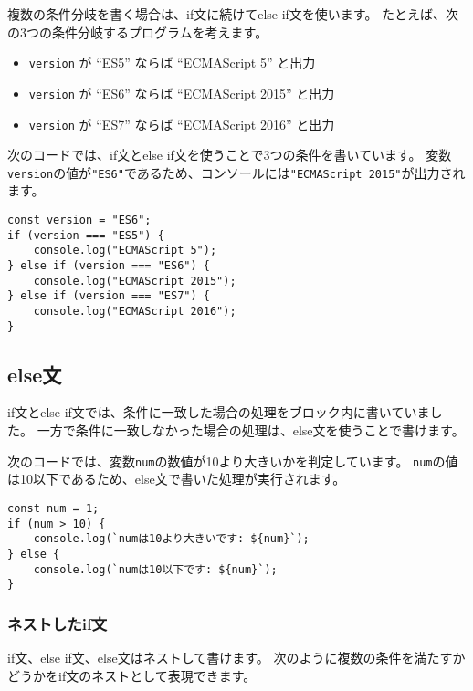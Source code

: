 複数の条件分岐を書く場合は、if文に続けてelse if文を使います。
たとえば、次の3つの条件分岐するプログラムを考えます。

\begin{itemize}
\item
  \texttt{version} が ``ES5'' ならば ``ECMAScript 5''
  と出力
\item
  \texttt{version} が ``ES6'' ならば ``ECMAScript
  2015'' と出力
\item
  \texttt{version} が ``ES7'' ならば ``ECMAScript
  2016'' と出力
\end{itemize}

次のコードでは、if文とelse if文を使うことで3つの条件を書いています。
変数\texttt{version}の値が\texttt{"ES6"}であるため、コンソールには\texttt{"ECMAScript 2015"}が出力されます。

\begin{lstlisting}
const version = "ES6";
if (version === "ES5") {
    console.log("ECMAScript 5");
} else if (version === "ES6") {
    console.log("ECMAScript 2015");
} else if (version === "ES7") {
    console.log("ECMAScript 2016");
}
\end{lstlisting}

\hypertarget{else-statement}{%
\subsection{else文}\label{else-statement}}

if文とelse
if文では、条件に一致した場合の処理をブロック内に書いていました。
一方で条件に一致しなかった場合の処理は、else文を使うことで書けます。

次のコードでは、変数\texttt{num}の数値が10より大きいかを判定しています。
\texttt{num}の値は10以下であるため、else文で書いた処理が実行されます。

\begin{lstlisting}
const num = 1;
if (num > 10) {
    console.log(`numは10より大きいです: ${num}`);
} else {
    console.log(`numは10以下です: ${num}`);
}
\end{lstlisting}

\hypertarget{nested-if-statement}{%
\subsubsection{ネストしたif文}\label{nested-if-statement}}

if文、else if文、else文はネストして書けます。
次のように複数の条件を満たすかどうかをif文のネストとして表現できます。


